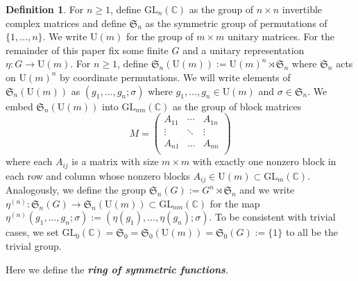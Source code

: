 \documentclass[12pt,reqno]{amsart}
\theoremstyle{definition}
\newtheorem{defn}[thm]{Definition}
\begin{document}
\begin{defn}
    For $n \geq 1$, define $\mathrm{GL}_n(\mathbb{C})$ as the group of $n\times n$ invertible complex matrices and define $\mathfrak{S}_n$ as the symmetric group of permutations of $\{1,\ldots,n\}.$ We write $\mathrm{U}(m)$ for the group of $m\times m $ unitary matrices. For the remainder of this paper fix some finite $G$ and a unitary representation $\eta: G \rightarrow \mathrm{U}(m)$. For $n \geq 1$, define $\mathfrak{S}_n(\mathrm{U}(m)):= \mathrm{U}(m)^n\rtimes \mathfrak{S}_n$ where $\mathfrak{S}_n$ acts on $\mathrm{U}(m)^n$ by coordinate permutations. We will write elements of $\mathfrak{S}_n(\mathrm{U}(m))$ as $(g_1,\ldots,g_n; \sigma)$ where $g_1,\ldots, g_n \in \mathrm{U}(m)$ and $\sigma \in \mathfrak{S}_n.$ We embed $\mathfrak{S}_n(\mathrm{U}(m))$ into $\mathrm{GL}_{nm}(\mathbb{C})$ as the group of block matrices 
    $$M = \begin{pmatrix}
        A_{11} & \cdots & A_{1n} \\
        \vdots & \ddots & \vdots \\
        A_{n1} & \ldots & A_{nn} \\
    \end{pmatrix}$$ where each $A_{ij}$ is a matrix with size $m\times m$ with exactly one nonzero block in each row and column whose nonzero blocks $A_{ij} \in \mathrm{U}(m) \subset \mathrm{GL}_m(\mathbb{C})$. Analogously, we define the group $\mathfrak{S}_n(G):= G^n \rtimes \mathfrak{S}_n$ and we write $\eta^{(n)}: \mathfrak{S}_n(G) \rightarrow \mathfrak{S}_n(\mathrm{U}(m)) \subset \mathrm{GL}_{nm}(\mathbb{C})$ for the map $\eta^{(n)}(g_1,\ldots,g_n;\sigma):= (\eta(g_1),\ldots, \eta(g_n);\sigma).$ To be consistent with trivial cases, we set $\mathrm{GL}_0(\mathbb{C}) = \mathfrak{S}_0 = \mathfrak{S}_0(\mathrm{U}(m)) = \mathfrak{S}_0(G) := \{1\}$ to all be the trivial group.
\end{defn}

Here we define the \textit{\textbf{ring of symmetric functions}}.
\end{document}
